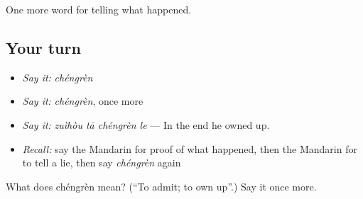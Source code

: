 \begin{grammarlens}[title={What you've built}]
One more word for telling what happened.
\end{grammarlens}

\subsection*{Your turn}
\begin{itemize}
\raggedright
  \item \emph{Say it:} \emph{chéngrèn}
  \item \emph{Say it:} \emph{chéngrèn}, once more
  \item \emph{Say it:} \emph{zuìhòu tā chéngrèn le} — In the end he owned up.
  \item \emph{Recall:} say the Mandarin for proof of what happened, then the Mandarin for to tell a lie, then say \emph{chéngrèn} again
\end{itemize}

\begin{tcolorbox}[breakable,colback=teal!4,colframe=teal!35!black,title={Before you move on}]
What does chéngrèn mean? (\textquotedblleft{}To admit; to own up\textquotedblright{}.) Say it once more.
\end{tcolorbox}
